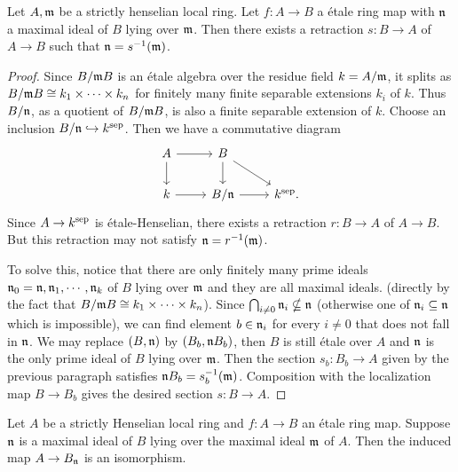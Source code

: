 \begin{proposition}
    \label{thm:strictly-henselian-good-retraction}
    Let \(A, {\mathfrak{m}}\) be a strictly henselian local ring. Let \(f : A \to B\) a \'etale ring map with \({\mathfrak{n}}\) a maximal ideal of \(B\) lying over \({\mathfrak{m}}\). Then there exists a retraction \(s : B \to A\) of \(A \to B\) such that \({\mathfrak{n}} = s^{-1}({\mathfrak{m}})\).
\end{proposition}

\begin{proof}
  Since \(B/{\mathfrak{m}} B\) is an étale algebra over the residue field \(k = A/{\mathfrak{m}}\), it splits as \(B/{\mathfrak{m}} B \cong k_1 \times \cdots \times k_n\) for finitely many finite separable extensions \(k_i\) of \(k\). Thus \(B/{\mathfrak{n}}\), as a quotient of \(B/{\mathfrak{m}} B\), is also a finite separable extension of \(k\). Choose an inclusion \(B/{\mathfrak{n}} \hookrightarrow k^{\textnormal{sep}}\). Then we have a commutative diagram
  \[
  \begin{tikzcd}
    A \arrow{r} \arrow{d} & B \arrow{d}\arrow{rd} & \\
    k \arrow{r} & B/\n \arrow{r} & k^{\sep}.
  \end{tikzcd}
  \]
  Since \(A \to k^{\textnormal{sep}}\) is étale-Henselian, there exists a retraction \(r : B \to A\) of \(A \to B\). But this retraction may not satisfy \({\mathfrak{n}} = r^{-1}({\mathfrak{m}})\). 
  
  To solve this, notice that there are only finitely many prime ideals \({\mathfrak{n}}_0 = {\mathfrak{n}}, {\mathfrak{n}}_1, \cdots, {\mathfrak{n}}_k\) of \(B\) lying over \({\mathfrak{m}}\) and they are all maximal ideals. (directly by the fact that \(B/{\mathfrak{m}} B \cong k_1 \times \cdots \times k_n\)). Since \(\bigcap_{i \ne 0} {\mathfrak{n}}_i \nsubseteq {\mathfrak{n}}\) (otherwise one of \({\mathfrak{n}}_i \subseteq {\mathfrak{n}}\) which is impossible), we can find element \(b \in {\mathfrak{n}}_i\) for every \(i \ne 0\) that does not fall in ${\mathfrak{n}}$. We may replace \((B, {\mathfrak{n}})\) by \((B_b, {\mathfrak{n}} B_b)\), then \(B\) is still étale over \(A\) and \({\mathfrak{n}}\) is the only prime ideal of \(B\) lying over \({\mathfrak{m}}\). Then the section \(s_b : B_b \to A\) given by the previous paragraph satisfies \({\mathfrak{n}} B_b = s_b^{-1}({\mathfrak{m}})\). Composition with the localization map \(B \to B_b\) gives the desired section \(s : B \to A\).
\end{proof}

\begin{proposition}
    \label{thm:etale-over-strictly-henselian-localization-isom}
    Let \(A\) be a strictly Henselian local ring and \(f : A \to B\) an étale ring map. Suppose \({\mathfrak{n}}\) is a maximal ideal of \(B\) lying over the maximal ideal \({\mathfrak{m}}\) of \(A\). Then the induced map \(A \to B_{\mathfrak{n}}\) is an isomorphism.
\end{proposition}

